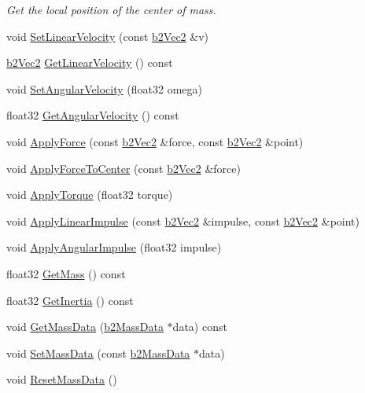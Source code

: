 \begin{DoxyCompactItemize}
\begin{DoxyCompactList}\small\item\em Get the local position of the center of mass. \end{DoxyCompactList}\item 
void \hyperlink{classb2_body_a832f3989a44f0d4782c80456832197ad}{Set\-Linear\-Velocity} (const \hyperlink{structb2_vec2}{b2\-Vec2} \&v)
\item 
\hyperlink{structb2_vec2}{b2\-Vec2} \hyperlink{classb2_body_ac7f1adfdef7c5c3d89fa44276fae0a5a}{Get\-Linear\-Velocity} () const 
\item 
void \hyperlink{classb2_body_a37adc4160b84f73e8552a91cbde3f578}{Set\-Angular\-Velocity} (float32 omega)
\item 
float32 \hyperlink{classb2_body_a158fe4c141168d2c3e65096b209f548c}{Get\-Angular\-Velocity} () const 
\item 
void \hyperlink{classb2_body_aa1a2ebd027635ea5a81749f267a19261}{Apply\-Force} (const \hyperlink{structb2_vec2}{b2\-Vec2} \&force, const \hyperlink{structb2_vec2}{b2\-Vec2} \&point)
\item 
void \hyperlink{classb2_body_ab3ede408c7f21b9828119b6b88f268ea}{Apply\-Force\-To\-Center} (const \hyperlink{structb2_vec2}{b2\-Vec2} \&force)
\item 
void \hyperlink{classb2_body_a2a383c0af1f91f449e74cfcec8fe2604}{Apply\-Torque} (float32 torque)
\item 
void \hyperlink{classb2_body_ada3c2a70cbb53c4fcee5a4febbbefc15}{Apply\-Linear\-Impulse} (const \hyperlink{structb2_vec2}{b2\-Vec2} \&impulse, const \hyperlink{structb2_vec2}{b2\-Vec2} \&point)
\item 
void \hyperlink{classb2_body_a2274ca61d7f63babf8fd30348e339083}{Apply\-Angular\-Impulse} (float32 impulse)
\item 
float32 \hyperlink{classb2_body_a4f62fea4546d2b9ca64a5f6723bbc71c}{Get\-Mass} () const 
\item 
float32 \hyperlink{classb2_body_a8c8916caf67c1e618a07d8b6b9253fa8}{Get\-Inertia} () const 
\item 
void \hyperlink{classb2_body_ad0a90df7e2617a8572cd476267f95417}{Get\-Mass\-Data} (\hyperlink{structb2_mass_data}{b2\-Mass\-Data} $\ast$data) const 
\item 
void \hyperlink{classb2_body_a58a641fedf8a81e1e26d09ec00a22fe2}{Set\-Mass\-Data} (const \hyperlink{structb2_mass_data}{b2\-Mass\-Data} $\ast$data)
\item 
void \hyperlink{classb2_body_a109d8567c6ae84c61fce2919fb209c63}{Reset\-Mass\-Data} ()

\end{DoxyCompactItemize}
